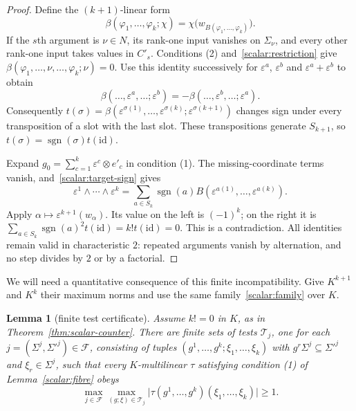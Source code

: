 \documentclass[11pt]{amsart}
\newtheorem{lemma}[theorem]{Lemma}
\theoremstyle{definition}
\theoremstyle{remark}
\numberwithin{equation}{section}
\newcommand{\sgn}{\operatorname{sgn}}
\newcommand{\id}{\mathrm{id}}
\newcommand{\abs}[1]{\lvert #1\rvert}
\theoremstyle{plain}
\theoremstyle{definition}
\theoremstyle{plain}
\begin{document}
\begin{proof}
Define the $(k+1)$\nobreakdash-linear form
\[
 \beta(\varphi_1,\dots,\varphi_k;\chi)
   =\chi\bigl(w_{B(\varphi_1,\dots,\varphi_k)}\bigr).
\]
If the $s$th argument is $\nu\in N$, its rank-one input vanishes on $\Sigma_\nu$, and every other
rank-one input takes values in $C'_s$. Conditions (2) and~\eqref{scalar:restriction} give
$\beta(\varphi_1,\dots,\nu,\dots,\varphi_k;\nu)=0$. Use this identity successively for
$\varepsilon^a$, $\varepsilon^b$ and $\varepsilon^a+\varepsilon^b$ to obtain
\[
 \beta(\dots,\varepsilon^a,\dots;\varepsilon^b)
 =-\beta(\dots,\varepsilon^b,\dots;\varepsilon^a).
\]
Consequently
$t(\sigma)=\beta(\varepsilon^{\sigma(1)},\dots,\varepsilon^{\sigma(k)};
\varepsilon^{\sigma(k+1)})$ changes sign under every transposition of a slot with the last slot.
These transpositions generate $S_{k+1}$, so $t(\sigma)=\sgn(\sigma)t(\id)$.

Expand $g_0=\sum_{c=1}^k\varepsilon^c\otimes e'_c$ in condition (1). The missing-coordinate terms vanish,
and~\eqref{scalar:target-sign} gives
\[
 \varepsilon^1\wedge\cdots\wedge\varepsilon^k
 =\sum_{a\in S_k}\sgn(a)B(\varepsilon^{a(1)},\dots,\varepsilon^{a(k)}).
\]
Apply $\alpha\mapsto\varepsilon^{k+1}(w_\alpha)$. Its value on the left is $(-1)^k$; on the right it is
$\sum_{a\in S_k}\sgn(a)^2t(\id)=k!t(\id)=0$. This is a contradiction. All identities remain valid in
characteristic $2$: repeated arguments vanish by alternation, and no step divides by $2$ or by a factorial.
\end{proof}

We will need a quantitative consequence of this finite incompatibility. Give $K^{k+1}$ and $K^k$ their
maximum norms and use the same family~\eqref{scalar:family} over $K$.

\begin{lemma}[finite test certificate]\label{scalar:certificate}
Assume $k!=0$ in $K$, as in Theorem~\ref{thm:scalar-counter}. There are finite sets of tests $\mathcal T_j$, one for each $j=(\Sigma^j,\Sigma'^j)\in\mathcal F$, consisting of
tuples $(g^1,\dots,g^k;\xi_1,\dots,\xi_k)$ with $g^r\Sigma^j\subseteq\Sigma'^j$ and $\xi_r\in\Sigma^j$,
such that every $K$\nobreakdash-multilinear $\tau$ satisfying condition (1) of Lemma~\ref{scalar:fibre} obeys
\begin{equation}\label{scalar:threshold}
 \max_{j\in\mathcal F}\max_{(g;\xi)\in\mathcal T_j}
 \abs{\tau(g^1,\dots,g^k)(\xi_1,\dots,\xi_k)}\ge1.
\end{equation}
\end{lemma}
\end{document}
